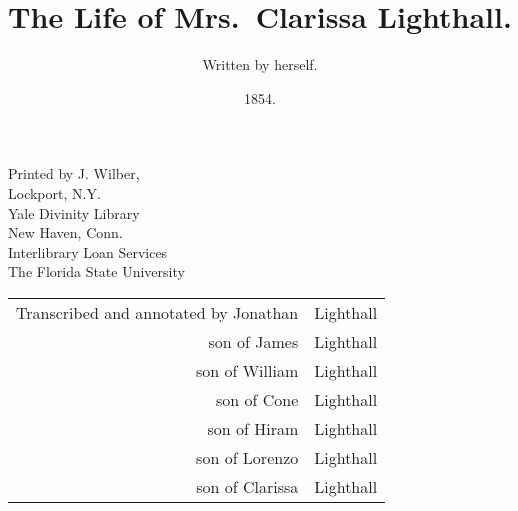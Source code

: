 \title{The Life of Mrs.\ Clarissa Lighthall.}
\author{Written by herself.}
\date{1854.}

\maketitle

\noindent Printed by J. Wilber,\\
Lockport, N.Y.\\

\noindent %
Yale Divinity Library\\
New Haven, Conn.\\

\noindent %
Interlibrary Loan Services\\
The Florida State University\\%

{\hspace*{-24pt} %
\begin{tabular}{r@{ }l}
Transcribed and annotated by Jonathan &Lighthall\\
son of James &Lighthall\\
son of William &Lighthall\\
son of Cone &Lighthall\\
son of Hiram &Lighthall\\
son of Lorenzo &Lighthall\\
son of Clarissa &Lighthall\\
\end{tabular}
}
